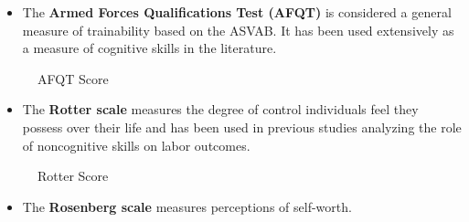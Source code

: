 \begin{frame}
\begin{itemize}
\item The \textbf{ Armed Forces Qualifications Test (AFQT)} is considered a general measure of trainability based on the ASVAB. It has been used extensively as a measure of cognitive skills in the literature.
\end{itemize}
\end{frame}

\begin{frame}\begin{figure}[htp]\centering
\caption{AFQT Score}
\end{figure}\end{frame}
\begin{frame}
\begin{itemize}
\item The \textbf{Rotter scale} \citep{Rotter.1966} measures the degree of control individuals feel they
possess over their life and has been used in previous studies analyzing
the role of noncognitive skills on labor outcomes.
\end{itemize}
\end{frame}
\begin{frame}\begin{figure}[htp]\centering
\caption{Rotter Score}
\end{figure}\end{frame}
\begin{frame}
\begin{itemize}
\item The \textbf{Rosenberg scale} \citep{Rosenberg.1965} measures perceptions of self-worth.
\end{itemize}
\end{frame}
